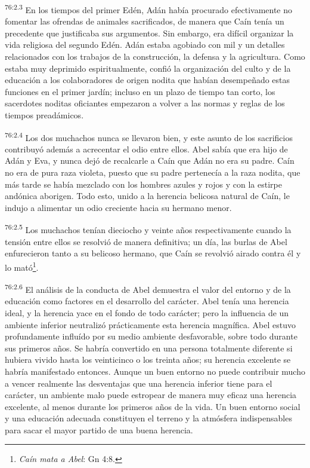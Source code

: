 \par
\textsuperscript{76:2.3} En los tiempos del primer Edén, Adán había procurado efectivamente no fomentar las ofrendas de animales sacrificados, de manera que Caín tenía un precedente que justificaba sus argumentos. Sin embargo, era difícil organizar la vida religiosa del segundo Edén. Adán estaba agobiado con mil y un detalles relacionados con los trabajos de la construcción, la defensa y la agricultura. Como estaba muy deprimido espiritualmente, confió la organización del culto y de la educación a los colaboradores de origen nodita que habían desempeñado estas funciones en el primer jardín; incluso en un plazo de tiempo tan corto, los sacerdotes noditas oficiantes empezaron a volver a las normas y reglas de los tiempos preadámicos.

\par
\textsuperscript{76:2.4} Los dos muchachos nunca se llevaron bien, y este asunto de los sacrificios contribuyó además a acrecentar el odio entre ellos. Abel sabía que era hijo de Adán y Eva, y nunca dejó de recalcarle a Caín que Adán no era su padre. Caín no era de pura raza violeta, puesto que su padre pertenecía a la raza nodita, que más tarde se había mezclado con los hombres azules y rojos y con la estirpe andónica aborigen. Todo esto, unido a la herencia belicosa natural de Caín, le indujo a alimentar un odio creciente hacia su hermano menor.

\par
\textsuperscript{76:2.5} Los muchachos tenían dieciocho y veinte años respectivamente cuando la tensión entre ellos se resolvió de manera definitiva; un día, las burlas de Abel enfurecieron tanto a su belicoso hermano, que Caín se revolvió airado contra él y lo mató\footnote{\textit{Caín mata a Abel}: Gn 4:8.}.

\par
\textsuperscript{76:2.6} El análisis de la conducta de Abel demuestra el valor del entorno y de la educación como factores en el desarrollo del carácter. Abel tenía una herencia ideal, y la herencia yace en el fondo de todo carácter; pero la influencia de un ambiente inferior neutralizó prácticamente esta herencia magnífica. Abel estuvo profundamente influído por su medio ambiente desfavorable, sobre todo durante sus primeros años. Se habría convertido en una persona totalmente diferente si hubiera vivido hasta los veinticinco o los treinta años; su herencia excelente se habría manifestado entonces. Aunque un buen entorno no puede contribuir mucho a vencer realmente las desventajas que una herencia inferior tiene para el carácter, un ambiente malo puede estropear de manera muy eficaz una herencia excelente, al menos durante los primeros años de la vida. Un buen entorno social y una educación adecuada constituyen el terreno y la atmósfera indispensables para sacar el mayor partido de una buena herencia.

